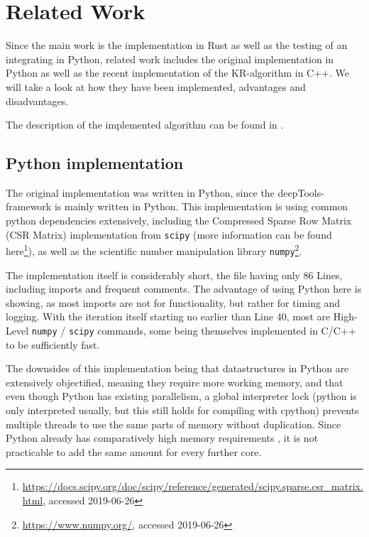 \chapter{Related Work}\label{chap:relatedwork}

Since the main work is the implementation in Rust as well as the testing of an
integrating in Python, related work includes the original implementation in
Python as well as the recent implementation of the KR-algorithm in C++.
We will take a look at how they have been implemented, advantages and
disadvantages.

 The description of the implemented algorithm can be found in .


\section{Python implementation}\label{sec:python}




The original implementation was written in Python, since the
deepTools-framework is mainly written in Python. This implementation is using
common python dependencies extensively, including the Compressed Sparse Row
Matrix (CSR Matrix) implementation from \verb|scipy| (more information can be found
here\footnote{\url{https://docs.scipy.org/doc/scipy/reference/generated/scipy.sparse.csr_matrix.html},
accessed 2019-06-26}), as well as the scientific number manipulation library
\verb|numpy|\footnote{\url{https://www.numpy.org/}, accessed 2019-06-26}.

The implementation itself is considerably short, the file having only 86 Lines,
including imports and frequent comments. The advantage of using Python here is
showing, as most imports are not for functionality, but rather for timing and
logging. With the iteration itself starting no earlier than Line 40, most
are High-Level \verb|numpy| / \verb|scipy| commands, some being themselves
implemented in C/C++ to be sufficiently fast.

The downsides of this implementation being that datastructures in Python are
extensively objectified, meaning they require more working memory, and that
even though Python has existing parallelism, a global interpreter lock (python
is only interpreted usually, but this still holds for compiling with cpython)
prevents multiple threads to use the same parts of memory without duplication.
Since Python already has comparatively high memory requirements , it is not practicable to add the same amount for every
further core.

